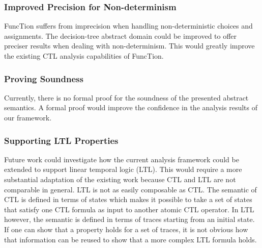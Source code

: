 \documentclass[11pt,a4paper,titlepage]{article}
\theoremstyle{definition}
\begin{document}
\subsubsection*{Improved Precision for Non-determinism}
FuncTion suffers from imprecision when handling non-deterministic choices and assignments. 
The decision-tree abstract domain could be improved to offer preciser results when dealing with non-determinism. 
This would greatly improve the existing CTL analysis capabilities of FuncTion.

\subsubsection*{Proving Soundness}
Currently, there is no formal proof for the soundness of the presented abstract semantics. 
A formal proof would improve the confidence in the analysis results of our framework.

\subsubsection*{Supporting LTL Properties}
Future work could investigate how the current analysis framework could be extended to support linear temporal logic (LTL). 
This would require a more substantial adaptation of the existing work because CTL and LTL are not comparable in general.
LTL is not as easily composable as CTL. The semantic of CTL is defined in terms of states which makes it possible 
to take a set of states that satisfy one CTL formula as input to another atomic CTL operator.
In LTL however, the semantic is defined in terms of traces starting from an initial state. 
If one can show that a property holds for a set of traces, 
it is not obvious how that information can be reused to show that a more complex LTL formula holds.



\pagebreak



\end{document}
